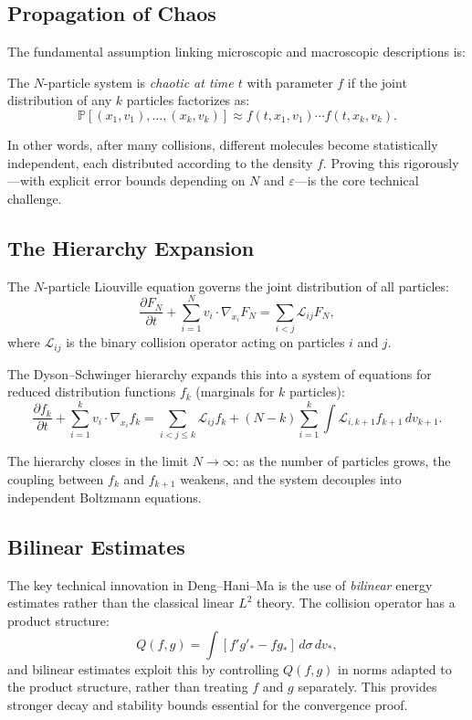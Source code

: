 \subsection{Propagation of Chaos}

The fundamental assumption linking microscopic and macroscopic descriptions is:

\begin{definition}
The $N$-particle system is \emph{chaotic at time $t$} with parameter $f$ if the joint distribution of any $k$ particles factorizes as:
\[
\mathbb{P}[(x_1, v_1), \ldots, (x_k, v_k)] \approx f(t, x_1, v_1) \cdots f(t, x_k, v_k).
\]
\end{definition}

In other words, after many collisions, different molecules become statistically independent, each distributed according to the density $f$. Proving this rigorously---with explicit error bounds depending on $N$ and $\varepsilon$---is the core technical challenge.

\subsection{The Hierarchy Expansion}

The $N$-particle Liouville equation governs the joint distribution of all particles:
\[
\frac{\partial F_N}{\partial t} + \sum_{i=1}^{N} v_i \cdot \nabla_{x_i} F_N = \sum_{i < j} \mathcal{L}_{ij} F_N,
\]
where $\mathcal{L}_{ij}$ is the binary collision operator acting on particles $i$ and $j$.

The Dyson--Schwinger hierarchy expands this into a system of equations for reduced distribution functions $f_k$ (marginals for $k$ particles):
\[
\frac{\partial f_k}{\partial t} + \sum_{i=1}^{k} v_i \cdot \nabla_{x_i} f_k = \sum_{i < j \le k} \mathcal{L}_{ij} f_k + (N - k) \sum_{i=1}^{k} \int \mathcal{L}_{i, k+1} f_{k+1} \, dv_{k+1}.
\]

The hierarchy closes in the limit $N \to \infty$: as the number of particles grows, the coupling between $f_k$ and $f_{k+1}$ weakens, and the system decouples into independent Boltzmann equations.

\subsection{Bilinear Estimates}

The key technical innovation in Deng--Hani--Ma is the use of \emph{bilinear} energy estimates rather than the classical linear $L^2$ theory. The collision operator has a product structure:
\[
Q(f, g) = \int [f' g'_* - f g_*] \, d\sigma \, dv_*,
\]
and bilinear estimates exploit this by controlling $Q(f, g)$ in norms adapted to the product structure, rather than treating $f$ and $g$ separately. This provides stronger decay and stability bounds essential for the convergence proof.

